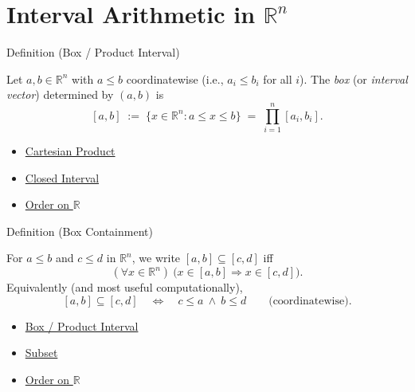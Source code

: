 
\section{Interval Arithmetic in $\mathbb{R}^n$}
\label{sec:interval-arithmetic-rn}

\begin{definitionbox}{Definition (Box / Product Interval)}
\begin{definition}\label{def:box}
Let $a,b\in\mathbb{R}^n$ with $a\le b$ coordinatewise (i.e., $a_i\le b_i$ for all $i$).
The \emph{box} (or \emph{interval vector}) determined by $(a,b)$ is
\[
[a,b] \;:=\; \{x\in\mathbb{R}^n : a\le x \le b\}
\;=\;\prod_{i=1}^n [a_i,b_i].
\]
\end{definition}
\end{definitionbox}

\begin{dependencies}
\begin{itemize}
  \item \hyperref[def:cartesian-product]{Cartesian Product}
  \item \hyperref[def:closed-interval]{Closed Interval}
  \item \hyperref[def:order-on-r]{Order on $\mathbb{R}$}
\end{itemize}
\end{dependencies}

\begin{definitionbox}{Definition (Box Containment)}
\begin{definition}\label{def:box-contain}
For $a\le b$ and $c\le d$ in $\mathbb{R}^n$, we write $[a,b]\subseteq[c,d]$ iff
\[
(\forall x\in\mathbb{R}^n)\ \bigl(x\in[a,b]\Rightarrow x\in[c,d]\bigr).
\]
Equivalently (and most useful computationally),
\[
[a,b]\subseteq[c,d]\quad \Longleftrightarrow\quad c\le a\ \land\ b\le d
\qquad\text{(coordinatewise).}
\]
\end{definition}
\end{definitionbox}

\begin{dependencies}
\begin{itemize}
  \item \hyperref[def:box]{Box / Product Interval}
  \item \hyperref[def:subset]{Subset}
  \item \hyperref[def:order-on-r]{Order on $\mathbb{R}$}
\end{itemize}
\end{dependencies}

